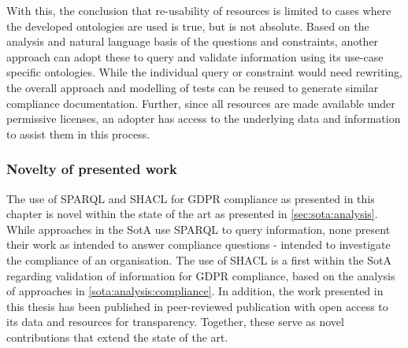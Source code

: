 With this, the conclusion that re-usability of resources is limited to cases where the developed ontologies are used is true, but is not absolute.
Based on the analysis and natural language basis of the questions and constraints, another approach can adopt these to query and validate information using its use-case specific ontologies.
While the individual query or constraint would need rewriting, the overall approach and modelling of tests can be reused to generate similar compliance documentation.
Further, since all resources are made available under permissive licenses, an adopter has access to the underlying data and information to assist them in this process.

\subsubsection{Novelty of presented work}
The use of SPARQL and SHACL for GDPR compliance as presented in this chapter is novel within the state of the art as presented in \autoref{sec:sota:analysis}.
While approaches in the SotA use SPARQL to query information, none present their work as intended to answer compliance questions - intended to investigate the compliance of an organisation.
The use of SHACL is a first within the SotA regarding validation of information for GDPR compliance, based on the analysis of approaches in \autoref{sota:analysis:compliance}.
In addition, the work presented in this thesis has been published in peer-reviewed publication with open access to its data and resources for transparency.
Together, these serve as novel contributions that extend the state of the art.
